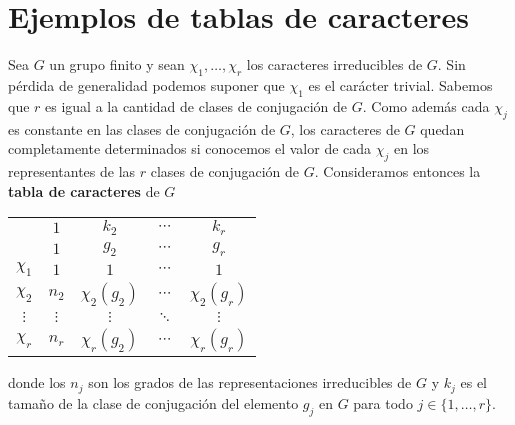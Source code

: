 \chapter{Ejemplos de tablas de caracteres}

Sea $G$ un grupo finito y sean $\chi_1,\dots,\chi_r$ los caracteres
irreducibles de $G$. Sin pérdida de generalidad podemos suponer que $\chi_1$ es
el carácter trivial.  Sabemos que $r$ es igual a la cantidad de clases de
conjugación de $G$. Como además cada $\chi_j$ es constante en las clases de
conjugación de $G$, los caracteres de $G$ quedan completamente determinados si
conocemos el valor de cada $\chi_j$ en los representantes de las $r$ clases de
conjugación de $G$. Consideramos entonces la \textbf{tabla de caracteres} de
$G$
\begin{center}
\begin{tabular}{|c|cccc|}
\hline 
 & $1$ & $k_{2}$ & $\cdots$ & $k_{r}$\tabularnewline
 & $1$ & $g_{2}$ & $\cdots$ & $g_{r}$\tabularnewline
\hline 
$\chi_{1}$ & $1$ & $1$ & $\cdots$ & $1$\tabularnewline
$\chi_{2}$ & $n_{2}$ & $\chi_{2}(g_{2})$ & $\cdots$ & $\chi_{2}(g_{r})$\tabularnewline
$\vdots$ & $\vdots$ & $\vdots$ & $\ddots$ & $\vdots$\tabularnewline
$\chi_{r}$ & $n_{r}$ & $\chi_{r}(g_{2})$ & $\cdots$ & $\chi_{r}(g_{r})$\tabularnewline
\hline
\end{tabular}
\end{center}
donde los $n_j$ son los grados de las representaciones irreducibles de $G$ y $k_j$ es el tamaño de 
la clase de conjugación del elemento $g_j$ en $G$ para todo $j\in\{1,\dots,r\}$. 


